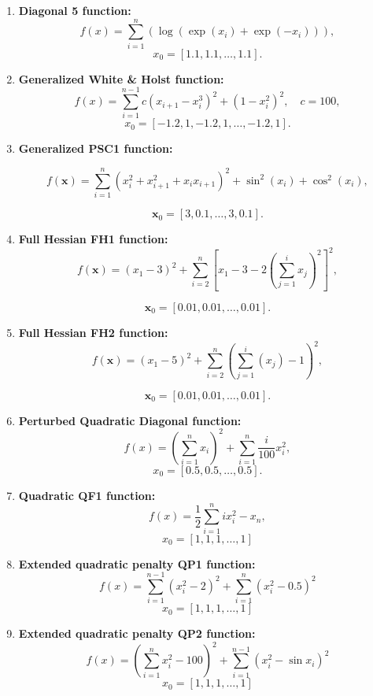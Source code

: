 \documentclass[10pt]{article}
\begin{document}
\begin{enumerate}
    \item \textbf{Diagonal 5 function:}
    \[
    f(x) = \sum_{i=1}^{n} \left( \log(\exp(x_i) + \exp(-x_i)) \right),
    \]
    \[
    x_0 = [1.1, 1.1, \dots, 1.1].
    \]

    \item \textbf{Generalized White \& Holst function:}
    \[
    f(x) = \sum_{i=1}^{n-1} c(x_{i+1} - x_i^3)^2 + (1 - x_i^2)^2 , \quad c = 100,
    \]
    \[
    x_0 = [-1.2, 1, -1.2, 1, \dots, -1.2, 1].
    \]

    \item \textbf{Generalized PSC1 function:}

    \[
    f(\mathbf{x}) = \sum_{i=1}^{n} \left( x_i^2 + x_{i+1}^2 + x_{i} x_{i+1} \right)^2 + \sin^2(x_{i}) + \cos^2(x_{i}),
    \]
    
    \[
    \mathbf{x}_0 = [3, 0.1, \ldots, 3, 0.1].
    \]

    \item \textbf{Full Hessian FH1 function:}
    \[
    f(\mathbf{x}) = (x_1 - 3)^2 + \sum_{i=2}^n \left[ x_1 - 3 - 2\left( \sum_{j=1}^i x_j \right)^2 \right]^2,
    \]

    \[
    \mathbf{x}_0 = [0.01, 0.01, \ldots, 0.01].
    \]

    \item \textbf{Full Hessian FH2 function:}
    \[
    f(\mathbf{x}) = (x_1 - 5)^2 + \sum_{i=2}^n \left( \sum_{j=1}^i (x_j) - 1 \right)^2,
    \]

    \[
    \mathbf{x}_0 = [0.01, 0.01, \ldots, 0.01].
    \]

    \item \textbf{Perturbed Quadratic Diagonal function:}
    \[
    f(x) = \left(\sum_{i=1}^{n}  x_i\right)^2 + \sum_{i=1}^n \frac{i}{100} x_i^2,
    \]
    \[
    x_0 = [0.5, 0.5, \dots, 0.5].
    \]

    \item \textbf{Quadratic QF1 function:}
    \[
    f(x) = \frac{1}{2} \sum_{i=1}^{n} i x_i^2 - x_n,
    \]
    \[
    x_0 = [1, 1, 1, \dots, 1]
    \]

    \item \textbf{Extended quadratic penalty QP1 function:}
    \[
    f(x) = \sum_{i=1}^{n-1} \left(x_i^2 - 2\right)^2 + \sum_{i=1}^{n} \left(x_i^2 - 0.5\right)^2
    \]
    \[
    x_0 = [1, 1, 1, \dots, 1]
    \]

    \item \textbf{Extended quadratic penalty QP2 function:}
    \[
    f(x) =\left( \sum_{i=1}^{n} x_i^2 - 100\right)^2 + \sum_{i=1}^{n-1} \left(x_i^2 - \sin x_i \right)^2
    \]
    \[
    x_0 = [1, 1, 1, \dots, 1]
    \]


\end{enumerate}
\end{document}
